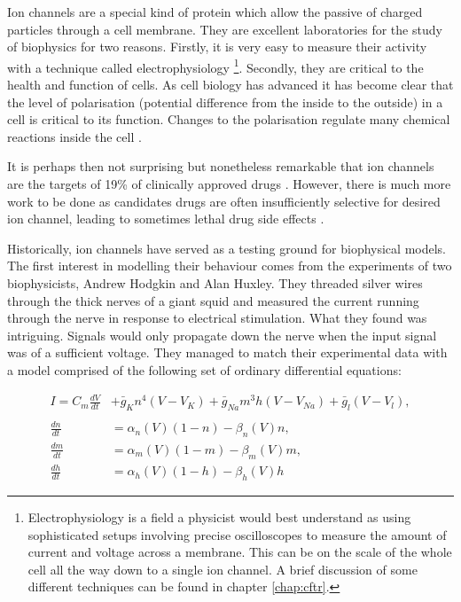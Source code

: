 Ion channels are a special kind of protein which allow the passive of charged particles through a cell membrane. They are excellent laboratories for the study of biophysics for two reasons. Firstly, it is very easy to measure their activity with a technique called electrophysiology \cite{hille2001} \footnote{Electrophysiology is a field a physicist would best understand as using sophisticated setups involving precise oscilloscopes to measure the amount of current and voltage across a membrane. This can be on the scale of the whole cell all the way down to a single ion channel. A brief discussion of some different techniques can be found in chapter \ref{chap:cftr}.}. Secondly, they are critical to the health and function of cells. As cell biology has advanced it has become clear that the level of polarisation (potential difference from the inside to the outside) in a cell is critical to its function. Changes to the polarisation regulate many chemical reactions inside the cell \cite{catterall2011, muthuswamy2012, levin2014, levin2014a}. 

It is perhaps then not surprising but nonetheless remarkable that ion channels are the targets of 19\% of clinically approved drugs \cite{santos2017}. However, there is much more work to be done as candidates drugs are often insufficiently selective for desired ion channel, leading to sometimes lethal drug side effects \cite{stansfeld2006, kaczorowski2008, waszkielewicz2013}.

Historically, ion channels have served as a testing ground for biophysical models. The first interest in modelling their behaviour comes from the experiments of two biophysicists, Andrew Hodgkin and Alan Huxley. They threaded silver wires through the thick nerves of a giant squid and measured the current running through the nerve in response to electrical stimulation. What they found was intriguing. Signals would only propagate down the nerve when the input signal was of a sufficient voltage. They managed to match their experimental data with a model comprised of the following set of ordinary differential equations:

\begin{equation}
	\label{hh_equations}
\begin{aligned}
	I = C_m \frac{dV}{dt} &+ \bar{g}_K n^4 (V - V_K) + \bar{g}_{Na} m^3 h (V - V_{Na} ) + \bar{g}_l (V-V_l) , \\ \\
	\frac{dn}{dt} &= \alpha_n(V)  (1-n) - \beta_n(V)  n, \\
	\frac{dm}{dt} &= \alpha_m(V)  (1-m) - \beta_m(V)  m, \\ 
	\frac{dh}{dt} &= \alpha_h(V)  (1-h) - \beta_h(V)  h  
\end{aligned}
\end{equation}

